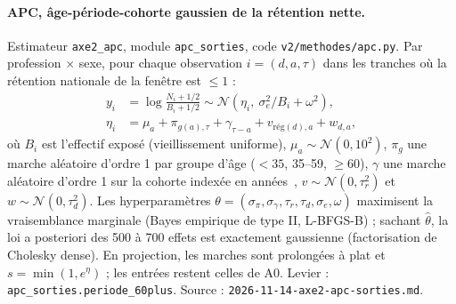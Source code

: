 \paragraph{APC, âge-période-cohorte gaussien de la rétention nette.} Estimateur \texttt{axe2\_apc},
module \texttt{apc\_sorties}, code \texttt{v2/methodes/apc.py}. Par profession $\times$ sexe, pour chaque
observation $i = (d, a, \tau)$ dans les tranches où la rétention nationale de la fenêtre est $\le 1$ :
\begin{align}
  y_i &= \log\frac{N_i + 1/2}{B_i + 1/2} \sim \mathcal N\!\left(\eta_i,\ \sigma_e^2/B_i + \omega^2\right),\\
  \eta_i &= \mu_a + \pi_{g(a),\tau} + \gamma_{\tau-a} + v_{\text{rég}(d),a} + w_{d,a},
\end{align}
où $B_i$ est l'effectif exposé (vieillissement uniforme), $\mu_a \sim \mathcal N(0,10^2)$, $\pi_g$ une marche
aléatoire d'ordre 1 par groupe d'âge ($<35$, 35--59, $\ge 60$), $\gamma$ une marche aléatoire d'ordre 1 sur
la cohorte indexée en années~\cite{b-schmid2007bamp}, $v \sim \mathcal N(0, \tau_r^2)$ et
$w \sim \mathcal N(0,\tau_d^2)$. Les hyperparamètres
$\theta = (\sigma_\pi, \sigma_\gamma, \tau_r, \tau_d, \sigma_e, \omega)$ maximisent la vraisemblance
marginale (Bayes empirique de type II, L-BFGS-B) ; sachant $\hat\theta$, la loi a posteriori des 500 à
700\mesure{} effets est exactement gaussienne (factorisation de Cholesky dense). En projection, les marches
sont prolongées à plat et $s = \min(1, e^{\eta})$ ; les entrées restent celles de A0. Levier :
\texttt{apc\_sorties.periode\_60plus}. Source : \texttt{2026-11-14-axe2-apc-sorties.md}.


